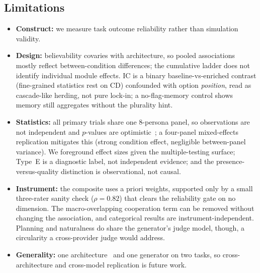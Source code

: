\documentclass[runningheads]{llncs}
\begin{document}
\subsection{Limitations}
\begin{itemize}[leftmargin=*,itemsep=1pt,topsep=2pt]
\item[] \textbf{Construct:} we measure task outcome reliability rather than simulation validity.
\item[] \textbf{Design:} believability covaries with architecture, so pooled associations mostly
reflect between-condition differences; the cumulative ladder does not identify individual module
effects. IC is a binary baseline-vs-enriched contrast (fine-grained statistics rest on CD)
confounded with option \emph{position}, read as cascade-like herding, not pure lock-in; a
no-flag-memory control shows memory still aggregates without the plurality hint.
\item[] \textbf{Statistics:} all primary trials share one 8-persona panel, so observations are not
independent and $p$-values are optimistic~\cite{wu2026boundary}; a four-panel mixed-effects
replication mitigates this (strong condition effect, negligible between-panel variance). We
foreground effect sizes given the multiple-testing surface; Type~E is a diagnostic label, not
independent evidence; and the presence-versus-quality distinction is observational, not causal.
\item[] \textbf{Instrument:} the composite uses a priori weights, supported only by a small
three-rater sanity check ($\rho=0.82$) that clears the reliability gate on no dimension. The
macro-overlapping cooperation term can be removed without changing the association, and
categorical results are instrument-independent. Planning and naturalness do share the generator's
judge model, though, a circularity a cross-provider judge would address.
\item[] \textbf{Generality:} one architecture~\cite{park2023generative} and one generator on two
tasks, so cross-architecture and cross-model replication is future work.
\end{itemize}
\end{document}
